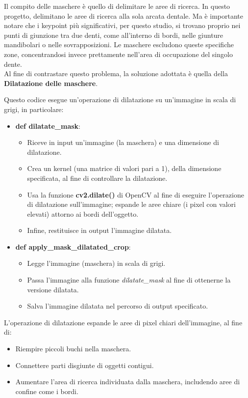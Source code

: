 \documentclass[12pt,a4paper,openright,twoside]{book}
\begin{document}
Il compito delle maschere è quello di delimitare le aree di ricerca. In questo progetto, delimitano le aree di ricerca alla sola arcata dentale. Ma è importante notare che i keypoint più significativi, per questo studio, si trovano proprio nei punti di giunzione tra due denti, come all'interno di bordi, nelle giunture mandibolari o nelle sovrapposizioni. Le maschere escludono queste specifiche zone, concentrandosi invece prettamente nell'area di occupazione del singolo dente.\\

Al fine di contrastare questo problema, la soluzione adottata è quella della \textbf{Dilatazione delle maschere}.
\begin{figure}[H]
    \centering
    
\end{figure}

Questo codice esegue un'operazione di dilatazione su un'immagine in scala di grigi, in particolare:
\begin{itemize}
\item \textbf{def dilatate\_mask}:\\
\begin{itemize}
\item Riceve in input un'immagine (la maschera) e una dimensione di dilatazione.
\item Crea un kernel (una matrice di valori pari a 1), della dimensione specificata, al fine di controllare la dilatazione.
\item Usa la funzione \textbf{cv2.dilate()} di OpenCV al fine di eseguire l'operazione di dilatazione sull'immagine; espande le aree chiare (i pixel con valori elevati) attorno ai bordi dell'oggetto.
\item Infine, restituisce in output l'immagine dilatata.
\end{itemize}
\item \textbf{def apply\_mask\_dilatated\_crop}:
\begin{itemize}
\item Legge l'immagine (maschera) in scala di grigi.
\item Passa l'immagine alla funzione {\itshape dilatate\_mask} al fine di ottenerne la versione dilatata.
\item Salva l'immagine dilatata nel percorso di output specificato.
\end{itemize}
\end{itemize}

L'operazione di dilatazione espande le aree di pixel chiari dell'immagine, al fine di:
\begin{itemize}
\item Riempire piccoli buchi nella maschera.
\item Connettere parti disgiunte di oggetti contigui.
\item Aumentare l'area di ricerca individuata dalla maschera, includendo aree di confine come i bordi.
\end{itemize}
\end{document}
